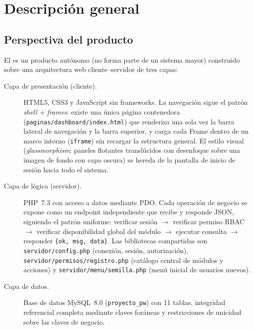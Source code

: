 \chapter{Descripción general}\label{cap:descripcion}

\section{Perspectiva del producto}

El \nombreSistema{} es un producto autónomo (no forma parte de un sistema
mayor) construido sobre una arquitectura web cliente--servidor de tres capas:

\begin{description}
    \item[Capa de presentación (cliente).] HTML5, CSS3 y JavaScript sin
    frameworks. La navegación sigue el patrón \textit{shell + frames}: existe
    una única página contenedora (\texttt{paginas/dashboard/index.html}) que
    renderiza una sola vez la barra lateral de navegación y la barra
    superior, y carga cada Frame dentro de un marco interno
    (\texttt{iframe}) sin recargar la estructura general. El estilo visual
    (\textit{glassmorphism}: paneles flotantes translúcidos con desenfoque
    sobre una imagen de fondo con capa oscura) se hereda de la pantalla de
    inicio de sesión hacia todo el sistema.

    \item[Capa de lógica (servidor).] PHP~7.3 con acceso a datos mediante
    PDO. Cada operación de negocio se expone como un endpoint independiente
    que recibe y responde JSON, siguiendo el patrón uniforme: verificar
    sesión $\rightarrow$ verificar permiso RBAC $\rightarrow$ verificar
    disponibilidad global del módulo $\rightarrow$ ejecutar consulta
    $\rightarrow$ responder \texttt{\{ok, msg, data\}}. Las bibliotecas
    compartidas son \texttt{servidor/config.php} (conexión, sesión,
    autorización), \texttt{servidor/permisos/registro.php} (catálogo central
    de módulos y acciones) y \texttt{servidor/menu/semilla.php} (menú
    inicial de usuarios nuevos).

    \item[Capa de datos.] Base de datos MySQL~8.0 (\texttt{proyecto\_pw})
    con 11 tablas, integridad referencial completa mediante claves foráneas
    y restricciones de unicidad sobre las claves de negocio.
\end{description}

